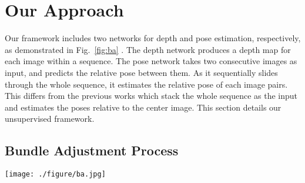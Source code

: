 \documentclass[10pt,twocolumn,letterpaper]{article}
\begin{document}
\section{Our Approach}
Our framework includes two networks for depth and pose estimation, respectively, as demonstrated in Fig.~\ref{fig:ba} . The depth network  produces a depth map for each image within a sequence. The pose network takes two consecutive images as input, and predicts the relative pose between them. As it sequentially slides through the whole sequence, it estimates the relative pose of each image pairs. This differs from the previous works \cite{zhou2017unsupervised,wang2018learning} which stack the whole sequence as  the input and estimates the poses relative to the center image. This section details our unsupervised framework.

\subsection{Bundle Adjustment Process}

\begin{figure*}
	\centering
	\texttt{[image: ./figure/ba.jpg]}	
	\caption{Our bundle adjustment unsupervised learning framework. In the traditional SLAM or VO system, camera poses and landmarks are jointly optimized in bundle adjustment. Similarly,  our algorithm jointly optimizes depths and camera poses by using  photometric consistency loss and cross-sequence geometric consistency loss.   Arcs represent view synthesis. The cross-sequence connections increase the baseline and  generate more constraints than previous works \cite{zhou2017unsupervised,vijayanarasimhan2017sfm,yang2018unsupervised,yin2018geonet,zou2018df,wang2018learning,mahjourian2018unsupervised}. We do not introduce corss-sequence connections to images, as the lighting condition may vary for distant frames, but the geometric constraints should always maintain.}
	\label{fig:ba}
\end{figure*}
\end{document}
